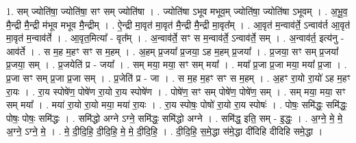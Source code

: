 \documentclass[17pt]{extarticle}
\begin{document}
1. सम् ज्योति॑षा॒ ज्योति॑षा॒ सꣳ सम् ज्योति॑षा । . ज्योति॑षा ऽभूव मभूव॒म् ज्योति॑षा॒ ज्योति॑षा ऽभूवम् । . अ॒भू॒व॒ मै॒न्द्री मै॒न्द्री म॑भूव मभूव मै॒न्द्रीम् । . ऐ॒न्द्री मा॒वृत॑ मा॒वृत॑ मै॒न्द्री मै॒न्द्री मा॒वृत᳚म् । . आ॒वृत॑ म॒न्वाव॑र्ते॒ ऽन्वाव॑र्त आ॒वृत॑ मा॒वृत॑ म॒न्वाव॑र्ते । . आ॒वृत॒मित्या᳚ - वृत᳚म् । . अ॒न्वाव॑र्ते॒ सꣳ स म॒न्वाव॑र्ते॒ ऽन्वाव॑र्ते॒ सम् । . अ॒न्वाव॑र्त॒ इत्य॑नु - आव॑र्ते । . स म॒ह म॒हꣳ सꣳ स म॒हम् । . अ॒हम् प्र॒जया᳚ प्र॒जया॒ ऽह म॒हम् प्र॒जया᳚ । . प्र॒जया॒ सꣳ सम् प्र॒जया᳚ प्र॒जया॒ सम् । . प्र॒जयेति॑ प्र - जया᳚ । . सम् मया॒ मया॒ सꣳ सम् मया᳚ । . मया᳚ प्र॒जा प्र॒जा मया॒ मया᳚ प्र॒जा । . प्र॒जा सꣳ सम् प्र॒जा प्र॒जा सम् । . प्र॒जेति॑ प्र - जा । . स म॒ह म॒हꣳ सꣳ स म॒हम् । . अ॒हꣳ रा॒यो रा॒यो॑ ऽह म॒हꣳ रा॒यः । . रा॒य स्पोषे॑ण॒ पोषे॑ण रा॒यो रा॒य स्पोषे॑ण । . पोषे॑ण॒ सꣳ सम् पोषे॑ण॒ पोषे॑ण॒ सम् । . सम् मया॒ मया॒ सꣳ सम् मया᳚ । . मया॑ रा॒यो रा॒यो मया॒ मया॑ रा॒यः । . रा॒य स्पोषः॒ पोषो॑ रा॒यो रा॒य स्पोषः॑ । . पोषः॒ समि॑द्धः॒ समि॑द्धः॒ पोषः॒ पोषः॒ समि॑द्धः । . समि॑द्धो अग्ने ऽग्ने॒ समि॑द्धः॒ समि॑द्धो अग्ने । . समि॑द्ध॒ इति॒ सम् - इ॒द्धः॒ । . अ॒ग्ने॒ मे॒ मे॒ अ॒ग्ने॒ ऽग्ने॒ मे॒ । . मे॒ दी॒दि॒हि॒ दी॒दि॒हि॒ मे॒ मे॒ दी॒दि॒हि॒ । . दी॒दि॒हि॒ स॒मे॒द्धा स॑मे॒द्धा दी॑दिहि दीदिहि समे॒द्धा । \newline
\end{document}
